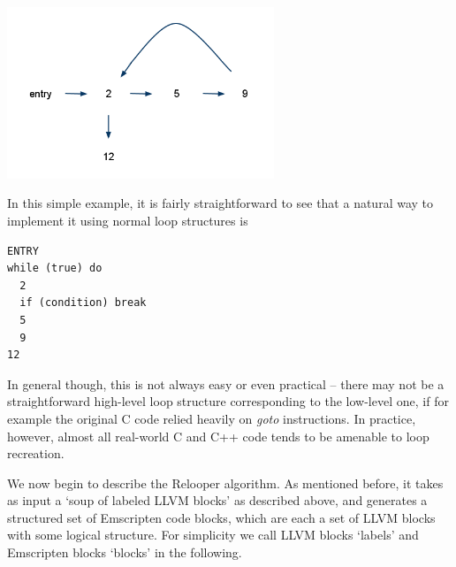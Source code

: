 \documentclass[preprint,10pt]{sigplanconf}
\begin{document}
\includegraphics[width=80mm]{graph.png}

In this simple example, it is fairly straightforward to see that a natural way to implement it
using normal loop structures is
\newpage
\begin{verbatim}
ENTRY
while (true) do
  2
  if (condition) break
  5
  9
12
\end{verbatim}
In general though, this is not always easy or even practical -- there may
not be a straightforward high-level loop structure corresponding to the low-level one, if
for example the original C code relied heavily on \emph{goto} instructions.
In practice, however, almost all real-world C and C++ code tends to
be amenable to loop recreation.

We now begin to describe the Relooper algorithm. As mentioned before, it takes as input a `soup of labeled LLVM blocks' as described above,
and generates a structured set of Emscripten code blocks, which are each a set of LLVM blocks
with some logical structure. For simplicity we call LLVM blocks `labels' and Emscripten
blocks `blocks' in the following.
\end{document}
